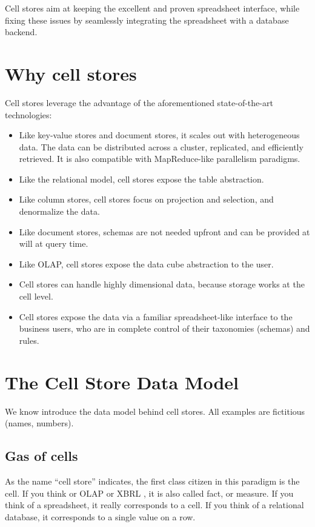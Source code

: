 \documentclass{acm_proc_article-sp}
\begin{document}
Cell stores aim at keeping the excellent and proven spreadsheet interface, while fixing these issues by seamlessly integrating the spreadsheet with a database backend.

\section{Why cell stores}
\label{section-why}

Cell stores leverage the advantage of the aforementioned state-of-the-art technologies:

\begin{itemize}
\item Like key-value stores and document stores, it scales out with heterogeneous data. The data can be distributed across a cluster, replicated, and efficiently retrieved. It is also compatible with MapReduce-like parallelism paradigms.
\item Like the relational model, cell stores expose the table abstraction.
\item Like column stores, cell stores focus on projection and selection, and denormalize the data. 
\item Like document stores, schemas are not needed upfront and can be provided at will at query time.
\item Like OLAP, cell stores expose the data cube abstraction to the user.
\item Cell stores can handle highly dimensional data, because storage works at the cell level.
\item Cell stores expose the data via a familiar spreadsheet-like interface to the business users, who are in complete control of their taxonomies (schemas) and rules.
\end{itemize}

\section{The Cell Store Data Model}
\label{section-data-model}

We know introduce the data model behind cell stores. All examples are fictitious (names, numbers).

\subsection{Gas of cells}

As the name ``cell store'' indicates, the first class citizen in this paradigm is the cell. If you think or OLAP or XBRL \cite{XBRL}, it is also called fact, or measure. If you think of a spreadsheet, it really corresponds to a cell. If you think of a relational database, it corresponds to a single value on a row.
\end{document}
